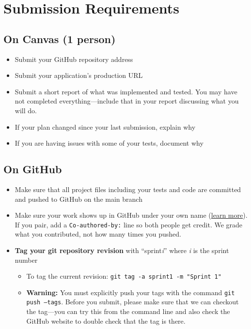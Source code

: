 \documentclass[11pt]{article}
\begin{document}
\section{Submission Requirements}

\subsection*{On Canvas (1 person)}
\begin{itemize}
    \item Submit your GitHub repository address
    \item Submit your application's production URL
    \item Submit a short report of what was implemented and tested. You may have not completed everything---include that in your report discussing what you will do.
    \item If your plan changed since your last submission, explain why
    \item If you are having issues with some of your tests, document why
\end{itemize}

\subsection*{On GitHub}
\begin{itemize}
    \item Make sure that all project files including your tests and code are committed and pushed to GitHub on the main branch
    \item Make sure your work shows up in GitHub under your own name (\href{https://help.github.com/articles/setting-your-username-in-git/}{learn more}). If you pair, add a \texttt{Co-authored-by:} line so both people get credit. We grade what you contributed, not how many times you pushed.
    \item \textbf{Tag your git repository revision} with ``sprint\textit{i}'' where \textit{i} is the sprint number
    \begin{itemize}
        \item To tag the current revision: \texttt{git tag -a sprint1 -m "Sprint 1"}
        \item \textbf{Warning:} You must explicitly push your tags with the command \texttt{git push --tags}. Before you submit, please make sure that we can checkout the tag---you can try this from the command line and also check the GitHub website to double check that the tag is there.
    \end{itemize}
\end{itemize}
\end{document}
